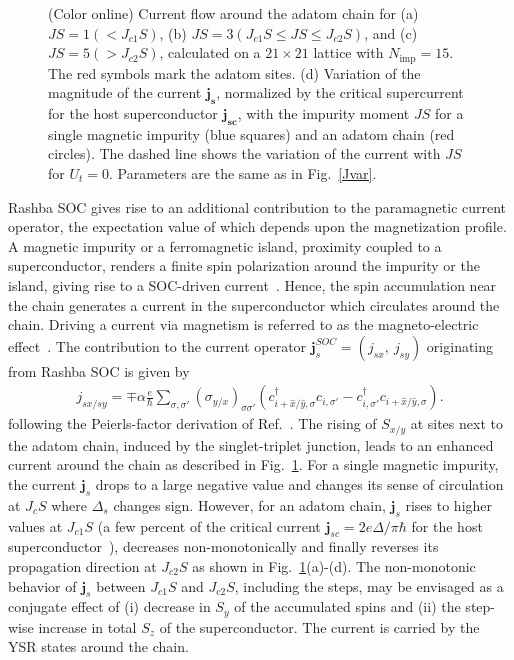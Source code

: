 \documentclass[aps,prl,reprint,nobibnotes]{revtex4-1}
\begin{document}
\begin{figure}[t]
\begin{center}
\vspace{-2em}
\caption{(Color online) Current flow around the adatom chain for (a) $JS=1(<J_{c1}S)$, (b) $JS=3(J_{c1}S \leq JS \leq J_{c2}S)$, and (c) $JS=5(>J_{c2}S)$, calculated on a $21 \times 21$ lattice with $N_{\text{imp}}=15$. The red symbols mark the adatom sites. (d) Variation of the magnitude of the current $ \mathbf{j_{s}}$, normalized by the critical supercurrent for the host superconductor $\mathbf{j_{sc}}$, with the impurity moment $JS$ for a single magnetic impurity (blue squares) and an adatom chain (red circles). The dashed line shows the variation of the current with $JS$ for $U_t=0$. Parameters are the same as in Fig.~\ref{Jvar}.} 
\label{supercurrent}
\end{center}
\end{figure}
Rashba SOC gives rise to an additional contribution to the paramagnetic current operator, the expectation value of which depends upon the magnetization profile. A magnetic impurity or a ferromagnetic island, proximity coupled to a superconductor, renders a finite spin polarization around the impurity or the island, giving rise to a SOC-driven current~\cite{PhysRevLett.115.116602,PhysRevB.92.214501}. Hence, the spin accumulation near the chain generates a current in the superconductor which circulates around the chain. Driving a current via magnetism is referred to as the magneto-electric effect~\cite{PhysRevB.72.172501}. The contribution to the current operator $\mathbf{j}_{s}^{SOC}=(j_{sx},~j_{sy})$ originating from Rashba SOC is given by
\begin{align*} 
j_{sx/sy}=\mp \alpha \frac{e}{\hbar}\sum_{\sigma,\sigma'} (\sigma_{y/x})_{\sigma \sigma'} (c_{i+\hat{x}/\hat{y},\sigma}^{\dagger}c_{i,\sigma'}-c_{i,\sigma'}^{\dagger}c_{i+\hat{x}/\hat{y},\sigma}).
\end{align*}
following the Peierls-factor derivation of Ref.~\cite{PhysRevB.47.7995}.
The rising of $S_{x/y}$ at sites next to the adatom chain, induced by the singlet-triplet junction, leads to an enhanced current around the chain as described in Fig.~\ref{supercurrent}. For a single magnetic impurity, the current $\mathbf{j}_{s}$ drops to a large negative value and changes its sense of circulation at $J_cS$ where $\Delta_s$ changes sign. However, for an adatom chain, $\mathbf{j}_{s}$ rises to higher values at $J_{c1}S$ (a few percent of the critical current $\mathbf{j}_{sc}=2e\Delta / \pi \hbar$ for the host superconductor~\cite{PhysRevB.49.6841}), decreases non-monotonically and finally reverses its propagation direction at $J_{c2}S$ as shown in Fig.~\ref{supercurrent}(a)-(d). The non-monotonic behavior of $\mathbf{j}_{s}$ between $J_{c1}S$ and $J_{c2}S$, including the steps, may be envisaged as a conjugate effect of (i) decrease in $S_y$ of the accumulated spins and (ii) the step-wise increase in total $S_z$ of the superconductor. The current is carried by the YSR states around the chain.
\end{document}
